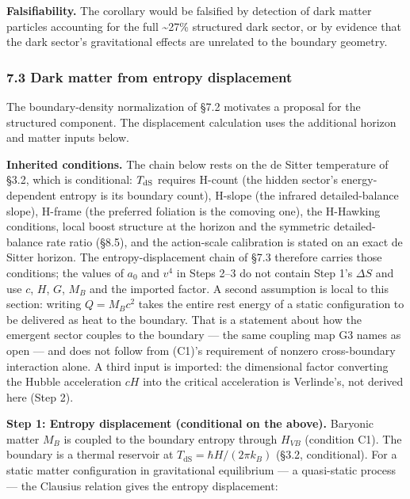 \documentclass[
]{article}
\begin{document}
\textbf{Falsifiability.} The corollary would be falsified by detection
of dark matter particles accounting for the full \textasciitilde27\%
structured dark sector, or by evidence that the dark sector's
gravitational effects are unrelated to the boundary geometry.

\hypertarget{dark-matter-from-entropy-displacement}{%
\subsubsection{7.3 Dark matter from entropy
displacement}\label{dark-matter-from-entropy-displacement}}

The boundary-density normalization of §7.2 motivates a proposal for the
structured component. The displacement calculation uses the additional
horizon and matter inputs below.

\textbf{Inherited conditions.} The chain below rests on the de Sitter
temperature of §3.2, which is conditional: \(T_{\rm dS}\) requires
H-count (the hidden sector's energy-dependent entropy is its boundary
count), H-slope (the infrared detailed-balance slope), H-frame (the
preferred foliation is the comoving one), the H-Hawking conditions,
local boost structure at the horizon and the symmetric detailed-balance
rate ratio (§8.5), and the action-scale calibration is stated on an
exact de Sitter horizon. The entropy-displacement chain of §7.3
therefore carries those conditions; the values of \(a_0\) and \(v^4\) in
Steps 2--3 do not contain Step 1's \(\Delta S\) and use \(c\), \(H\),
\(G\), \(M_B\) and the imported factor. A second assumption is local to
this section: writing \(Q=M_Bc^2\) takes the entire rest energy of a
static configuration to be delivered as heat to the boundary. That is a
statement about how the emergent sector couples to the boundary --- the
same coupling map G3 names as open --- and does not follow from (C1)'s
requirement of nonzero cross-boundary interaction alone. A third input
is imported: the dimensional factor converting the Hubble acceleration
\(cH\) into the critical acceleration is Verlinde's, not derived here
(Step 2).

\textbf{Step 1: Entropy displacement (conditional on the above).}
Baryonic matter \(M_B\) is coupled to the boundary entropy through
\(H_{VB}\) (condition C1). The boundary is a thermal reservoir at
\(T_{\text{dS}} = \hbar H / (2\pi k_B)\) (§3.2, conditional). For a
static matter configuration in gravitational equilibrium --- a
quasi-static process --- the Clausius relation gives the entropy
displacement:
\end{document}
